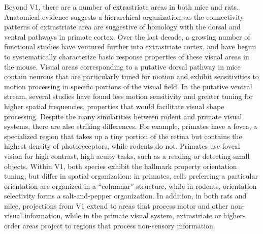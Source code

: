 Beyond V1, there are a number of extrastriate areas in both mice\cite{Andermann2011, Marshel2011, Juavinett2017} and rats\cite{Espinoza1983, Coogan1993}. Anatomical evidence suggests a hierarchical organization\cite{Wang2007, Wang2011}, as the connectivity patterns of extrastriate area are suggestive of homology with the dorsal and ventral pathways in primate cortex. Over the last decade, a growing number of functional studies have ventured further into extrastriate cortex, and have begun to systematically characterize basic response properties of these visual areas in the mouse\cite{Andermann2011, Marshel2011, Glickfeld2013, Glickfeld2017, DeVries2020, Siegle2021}. Visual areas corresponding to a putative dorsal pathway in mice contain neurons that are particularly tuned for motion\cite{Andermann2011, Marshel2011, Glickfeld2013} and exhibit sensitivities to motion processing in specific portions of the visual field\cite{Sit2020}. In the putative ventral stream, several studies have found less motion sensitivity and greater tuning for higher spatial frequencies\cite{Glickfeld2013, Tohmi2014}, properties that would facilitate visual shape processing. 
% 
Despite the many similarities between rodent and primate visual systems, there are also striking differences. For example, primates have a fovea, a specialized region that takes up a tiny portion of the retina but contains the highest density of photoreceptors\cite{Perry1985}, while rodents do not. Primates use foveal vision for high contrast, high acuity tasks, such as a reading or detecting small objects. Within V1, both species exhibit the hallmark property orientation tuning, but differ in spatial organization: in primates, cells preferring a particular orientation are organized in a ``columnar'' structure, while in rodents, orientation selectivity forms a salt-and-pepper organization\cite{Ohki2005}. In addition, in both rats and mice, projections from V1 extend to areas that process motor and other non-visual information, while in the primate visual system, extrastriate or higher-order areas project to regions that process non-sensory information. 

